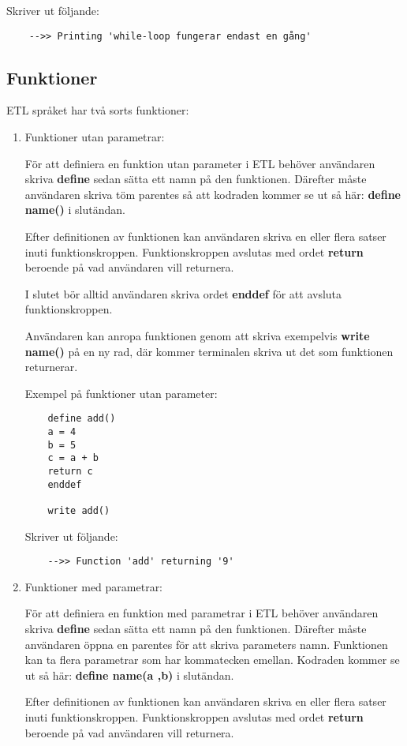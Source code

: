\documentclass{TDP019mall}
\begin{document}
Skriver ut följande:
\begin{verbatim}
    -->> Printing 'while-loop fungerar endast en gång'
\end{verbatim}


\subsection{Funktioner}
ETL språket har två sorts funktioner:
\begin{enumerate}
\item Funktioner utan parametrar:

För att definiera en funktion utan parameter i ETL behöver användaren skriva \textbf{define} sedan sätta ett namn på den funktionen. 
Därefter måste användaren skriva töm parentes så att kodraden kommer se ut så här: \textbf{define name()} i slutändan.
 
Efter definitionen av funktionen kan användaren skriva en eller flera satser inuti funktionskroppen. Funktionskroppen avslutas med 
ordet \textbf{return} beroende på vad användaren vill returnera.
 
I slutet bör alltid användaren skriva ordet \textbf{enddef} för att avsluta funktionskroppen. 
 
Användaren kan anropa funktionen genom att skriva exempelvis \textbf{write name()} på en ny rad, där kommer terminalen skriva 
ut det som funktionen returnerar.  
 
Exempel på funktioner utan parameter:
\begin{verbatim}
    define add()
    a = 4
    b = 5
    c = a + b
    return c
    enddef

    write add()
\end{verbatim}
 
Skriver ut följande:
\begin{verbatim}
    -->> Function 'add' returning '9'
\end{verbatim}

 
\item Funktioner med parametrar:

För att definiera en funktion med parametrar i ETL behöver användaren skriva \textbf{define} sedan sätta ett namn på den funktionen. 
Därefter måste användaren öppna en parentes för att skriva parameters namn. Funktionen kan ta flera parametrar som har kommatecken emellan. 
Kodraden kommer se ut så här: \textbf{define name(a ,b)} i slutändan.
 
Efter definitionen av funktionen kan användaren skriva en eller flera satser inuti funktionskroppen. Funktionskroppen avslutas med 
ordet \textbf{return} beroende på vad användaren vill returnera.
 

\end{enumerate}
\end{document}
